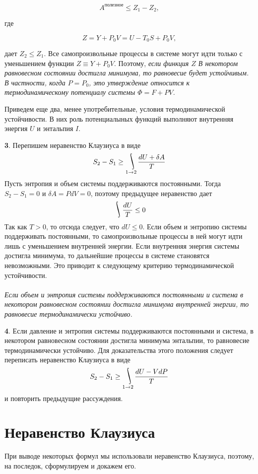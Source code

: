 \documentclass[a4paper,14pt]{article} %
\DeclareMathOperator*{\myint}{\ThisStyle{\rotatebox{25}{$\SavedStyle\!\int\!\!\!$}}}
\begin{document}
\begin{equation*}
A^{\text {полезное}} \leqslant Z_{1}-Z_{2},
\end{equation*}

где 

\begin{equation*}
Z=Y+P_{0} V=U-T_{0} S+P_{0} V,
\end{equation*}

 дает $Z_{2} \leqslant Z_{1} .$ Все самопроизвольные процессы в системе могут идти только с уменьшением функции $Z \equiv Y+P_{0} V .$ Поэтому, \textit{если финкция $Z$ В некотором равновесном состоянии достигла минимума, то равновесие будет устойчивым. В частности, когда $P = P_0$,  это утверждение относится к термодинамическому потенциалу системы $\Phi = F+ P V$.}
 
Приведем еще два, менее употребительные, условия термодинамической устойчивости. В них роль потенциалыных функций выполняют внутренняя энергия $U$ и энтальпия $I$.

\textbf{3}. Перепишем неравенство Клаузиуса в виде
\[S_2 - S_1 \geq \myint_{1\rightarrow 2}{\frac{dU + \delta A}{T}}\]
Пусть энтропия и объем системы поддерживаются постоянными. Тогда $S_2 - S_1 = 0$ и $\delta A = PdV = 0$, поэтому предыдущее неравенство дает 
\[\myint{\frac{dU}{T}} \leq 0\]
Так как $T > 0$, то отсюда следует, что $dU \leq 0$. Если объем и
энтропию системы поддерживать постоянными, то самопроизвольные процессы в ней могут идти лишь с уменьшением внутренней
энергии. Если внутренняя энергия системы достигла минимума, то
дальнейшие процессы в системе становятся невозможными. Это
приводит к следующему критерию термодинамической устойчивости.\\\\
\textit{Если объем и энтропия системы поддерживаются постоянными
и система в некотором равновесном состоянии достигла минимума
внутренней энергии, то равновесие термодинамически устойчиво.} 

\textbf{4}. Если давление и энтропия системы поддерживаются постоянными и система, в некотором равновесном состоянии достигла минимума энтальпии, то равновесие термодинамически устойчиво.
Для доказательства этого положения следует переписать неравенство Клаузиуса в виде 
\[S_2 - S_1 \geq \myint_{1\rightarrow 2}{\frac{dU - VdP}{T}}\]
и повторить предыдущие рассуждения.

\section{Неравенство Клаузиуса}
При выводе некоторых формул мы использовали неравенство Клаузиуса, поэтому, на последок, сформулируем и докажем его.
\end{document}
